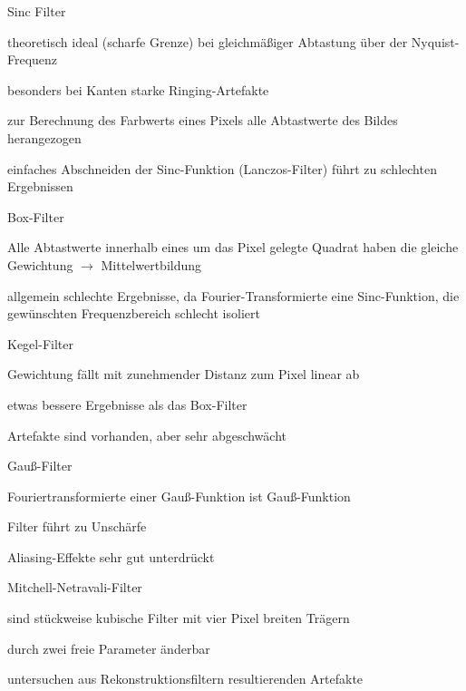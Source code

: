 \documentclass[landscape]{article}
\begin{document}
\begin{multicols}{3}
  \begin{description*}
    \item[Sinc Filter]
    \begin{itemize*}
      \item theoretisch ideal (scharfe Grenze) bei gleichmäßiger Abtastung über der Nyquist-Frequenz
      \item besonders bei Kanten starke Ringing-Artefakte 
      \item zur Berechnung des Farbwerts eines Pixels alle Abtastwerte des Bildes herangezogen
      \item einfaches Abschneiden der Sinc-Funktion (Lanczos-Filter) führt zu schlechten Ergebnissen
    \end{itemize*}
    \item[Box-Filter]
    \begin{itemize*}
      \item Alle Abtastwerte innerhalb eines um das Pixel gelegte Quadrat haben die gleiche Gewichtung $\rightarrow$ Mittelwertbildung
      \item allgemein schlechte Ergebnisse, da Fourier-Transformierte eine Sinc-Funktion, die gewünschten Frequenzbereich schlecht isoliert
    \end{itemize*}
    \item[Kegel-Filter]
    \begin{itemize*}
      \item Gewichtung fällt mit zunehmender Distanz zum Pixel linear ab
      \item etwas bessere Ergebnisse als das Box-Filter
      \item Artefakte sind vorhanden, aber sehr abgeschwächt
    \end{itemize*}
    \item[Gauß-Filter]
    \begin{itemize*}
      \item Fouriertransformierte einer Gauß-Funktion ist Gauß-Funktion
      \item Filter führt zu Unschärfe
      \item Aliasing-Effekte sehr gut unterdrückt
    \end{itemize*}
    \item[Mitchell-Netravali-Filter]
    \begin{itemize*}
      \item sind stückweise kubische Filter mit vier Pixel breiten Trägern
      \item durch zwei freie Parameter änderbar 
      \item untersuchen aus Rekonstruktionsfiltern resultierenden Artefakte

\end{itemize*}
\end{description*}
\end{multicols}
\end{document}
